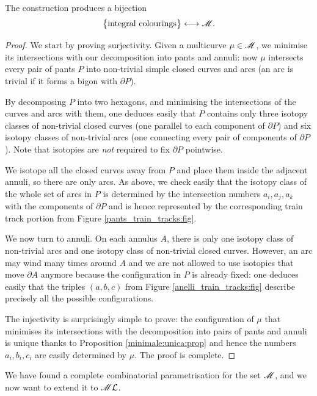 \begin{prop} \label{parametrize:multicurves:prop}
The construction produces a bijection
$$\big\{ {\rm integral\ colourings}\big\} \longleftrightarrow \calM.$$
\end{prop}
\begin{proof}
We start by proving surjectivity. Given a multicurve $\mu\in \mathscr{M}$, we minimise its intersections with our decomposition into pants and annuli: now $\mu$ intersects every pair of pants $P$ into non-trivial simple closed curves and arcs (an arc is trivial if it forms a bigon with $\partial P$). 

By decomposing $P$ into two hexagons, and minimising the intersections of the curves and arcs with them, one deduces easily that $P$ contains only three isotopy classes of non-trivial closed curves (one parallel to each component of $\partial P$) and six isotopy classes of non-trivial arcs (one connecting every pair of components of $\partial P$). Note that isotopies are \emph{not} required to fix $\partial P$ pointwise.

We isotope all the closed curves away from $P$ and place them inside the adjacent annuli, so there are only arcs. As above, we check easily that the isotopy class of the whole set of arcs in $P$ is determined by the intersection numbers $a_i, a_j, a_k$ with the components of $\partial P$ and is hence represented by the corresponding train track portion from Figure \ref{pants_train_tracks:fig}. 

We now turn to annuli. On each annulus $A$, there is only one isotopy class of non-trivial arcs and one isotopy class of non-trivial closed curves. However, an arc may wind many times around $A$ and we are not allowed to use isotopies that move $\partial A$ anymore because the configuration in $P$ is already fixed: one deduces easily that the triples $(a,b,c)$ from Figure \ref{anelli_train_tracks:fig} describe precisely all the possible configurations. 

The injectivity is surprisingly simple to prove: the configuration of $\mu$ that minimises its intersections with the decomposition into pairs of pants and annuli is unique thanks to Proposition \ref{minimale:unica:prop} and hence the numbers $a_i,b_i,c_i$ are easily determined by $\mu$. The proof is complete.
\end{proof}

We have found a complete combinatorial parametrisation for the set $\mathscr{M}$, and we now want to extend it to $\mathscr{M}\mathcal{L}$.

